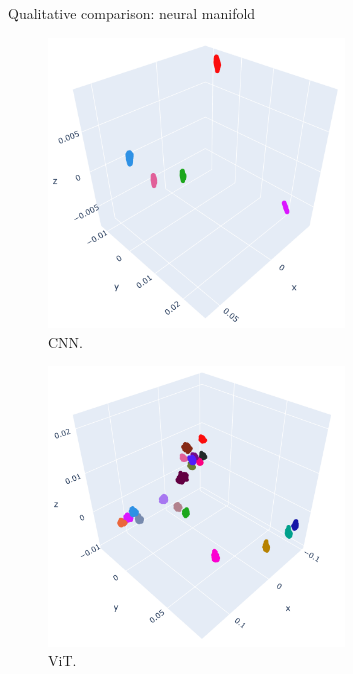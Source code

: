 \documentclass[xcolor={dvipsnames,svgnames}]{beamer}
\begin{document}
\begin{frame}{Qualitative comparison: neural manifold}
        \begin{minipage}[t]{.45\linewidth}  
    \begin{figure}
            \includegraphics[width=0.7\textwidth]{figures/embeddings/VGG16-2D-block1.png}
            \caption{CNN.}
        \end{figure} 
    \end{minipage}
      \begin{minipage}[t]{.45\linewidth}   
      \begin{figure}         \includegraphics[width=0.7\textwidth]{figures/embeddings/vit-2d-layer1.png}
      \caption{ViT.}
            \end{figure} 
    \end{minipage}
\end{frame}
\end{document}
